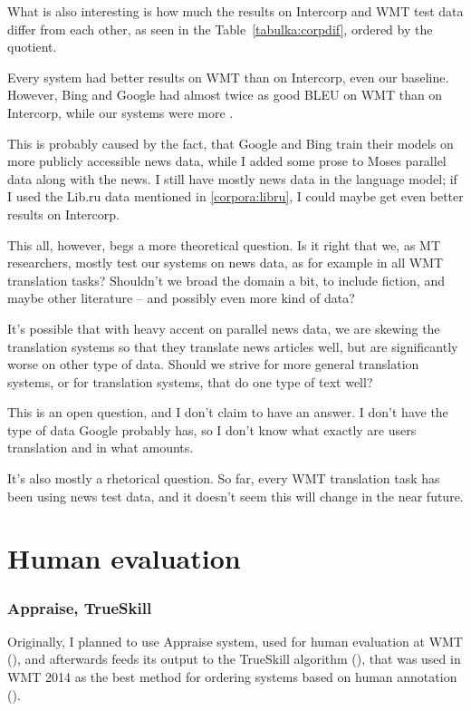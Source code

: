 What is also interesting is how much the results on Intercorp and WMT test data differ from each other, as seen in the Table~\ref{tabulka:corpdif}, ordered by the quotient.  

Every system had better results on WMT than on Intercorp, even our baseline. However, Bing and Google had almost twice as good BLEU on WMT than on Intercorp, while our systems were more .

This is probably caused by the fact, that Google and Bing train their models on more publicly accessible news data, while I added some prose to Moses parallel data along with the news. I still have mostly news data in the language model; if I used the Lib.ru data mentioned in \ref{corpora:libru}, I could maybe get even better results on Intercorp.

This all, however, begs a more theoretical question. 
Is it right that we, as MT researchers, mostly test our systems on news data, as for example in all WMT translation tasks? 
Shouldn't we broad the domain a bit, to include fiction, and maybe other literature -- and possibly even more kind of data?

It's possible that with heavy accent on parallel news data, we are skewing the translation systems so that they translate news articles well, but are significantly worse on other type of data. Should we strive for more general translation systems, or for translation systems, that do one type of text well?

This is an open question, and I don't claim to have an answer. I don't have the type of data Google probably has, so I don't know what exactly are users translation and in what amounts.

It's also mostly a rhetorical question. So far, every WMT translation task has been using news test data, and it doesn't seem this will change in the near future.

\section{Human evaluation}
\label{results:human}


\subsubsection{Appraise, TrueSkill}
Originally, I planned to use Appraise system, used for human evaluation at WMT (\cite{appraise}), 
and afterwards feeds its output to the TrueSkill algorithm (\cite{trueskill}), that was used in WMT 2014 as the best method for ordering systems based on human annotation (\cite{wmt_findings_2014}). 

